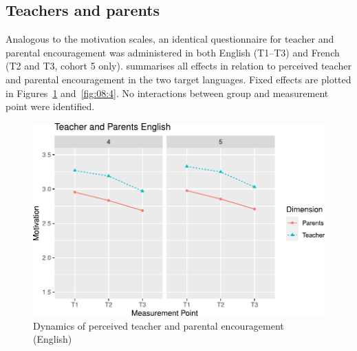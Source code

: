 \documentclass[output=paper]{langsci/langscibook}
\begin{document}
\subsection{Teachers and parents}

Analogous to the motivation scales, an identical questionnaire for teacher and parental encouragement was administered in both English (T1--T3) and French (T2 and T3, cohort 5 only).   summarises all effects in relation to perceived teacher and parental encouragement in the two target languages. Fixed effects are plotted in Figures~\ref{fig:08:3}  and~\ref{fig:08:4}. No interactions between group and measurement point were identified.


\begin{table}
\caption{Fixed and random effects for perceived teacher and parental encouragement\label{tab:08:4}. EN: English, FR: French, TE: Teacher encouragement, PE: Parental encouragement, Int: Intercept.}
\end{table}

  
\begin{figure}
\includegraphics[width=\textwidth]{figures/Fig8.3.pdf}
\caption{Dynamics of perceived teacher and parental encouragement (English)\label{fig:08:3}}
\end{figure}
\end{document}
